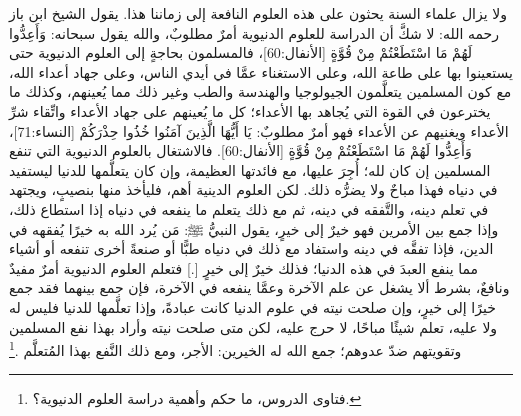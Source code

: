 ولا يزال علماء السنة يحثون على هذه العلوم النافعة إلى زماننا هذا.  يقول الشيخ ابن باز رحمه الله: لا شكَّ أن الدراسة للعلوم الدنيوية أمرٌ مطلوبٌ، والله يقول سبحانه: وَأَعِدُّوا لَهُمْ مَا اسْتَطَعْتُمْ مِنْ قُوَّةٍ [الأنفال:60]، فالمسلمون بحاجةٍ إلى العلوم الدنيوية حتى يستعينوا بها على طاعة الله، وعلى الاستغناء عمَّا في أيدي الناس، وعلى جهاد أعداء الله، مع كون المسلمين يتعلَّمون الجيولوجيا والهندسة والطب وغير ذلك مما يُعينهم، وكذلك ما يخترعون في القوة التي يُجاهد بها الأعداء؛ كل ما يُعينهم على جهاد الأعداء واتِّقاء شرِّ الأعداء ويغنيهم عن الأعداء فهو أمرٌ مطلوبٌ: يَا أَيُّهَا الَّذِينَ آمَنُوا خُذُوا حِذْرَكُمْ [النساء:71]، وَأَعِدُّوا لَهُمْ مَا اسْتَطَعْتُمْ مِنْ قُوَّةٍ [الأنفال:60]. فالاشتغال بالعلوم الدنيوية التي تنفع المسلمين إن كان لله؛ أُجِرَ عليها، مع فائدتها العظيمة، وإن كان يتعلَّمها للدنيا ليستفيد في دنياه فهذا مباحٌ ولا يضرُّه ذلك. لكن العلوم الدينية أهم، فليأخذ منها بنصيبٍ، ويجتهد في تعلم دينه، والتَّفقه في دينه، ثم مع ذلك يتعلم ما ينفعه في دنياه إذا استطاع ذلك، وإذا جمع بين الأمرين فهو خيرٌ إلى خيرٍ، يقول النبيُّ ﷺ: مَن يُرد الله به خيرًا يُفقهه في الدين، فإذا تفقَّه في دينه واستفاد مع ذلك في دنياه طبًّا أو صنعةً أخرى تنفعه أو أشياء مما ينفع العبدَ في هذه الدنيا؛ فذلك خيرٌ إلى خيرٍ [.] فتعلم العلوم الدنيوية أمرٌ مفيدٌ ونافعٌ، بشرط ألا يشغل عن علم الآخرة وعمَّا ينفعه في الآخرة، فإن جمع بينهما فقد جمع خيرًا إلى خيرٍ، وإن صلحت نيته في علوم الدنيا كانت عبادةً، وإذا تعلَّمها للدنيا فليس له ولا عليه، تعلم شيئًا مباحًا، لا حرج عليه، لكن متى صلحت نيته وأراد بهذا نفع المسلمين وتقويتهم ضدّ عدوهم؛ جمع الله له الخيرين: الأجر، ومع ذلك النَّفع بهذا المُتعلَّم \href{https://www.youtube.com/watch?v=soOBNJPR0E8}{\faExternalLink}.\footnote{فتاوى الدروس، ما حكم وأهمية دراسة العلوم الدنيوية؟.}

